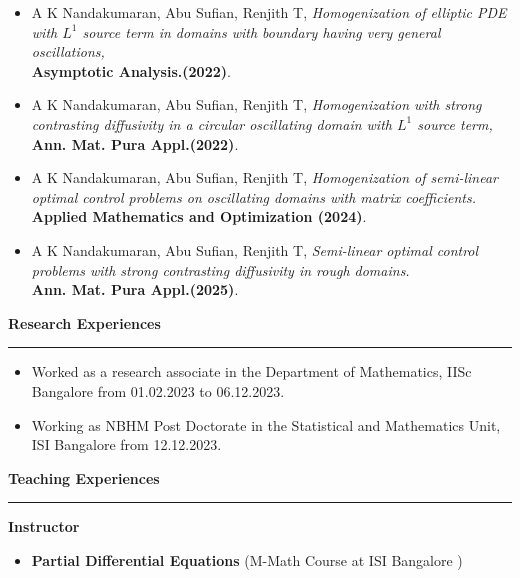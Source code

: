 \documentclass[a4paper,11pt]{letter}
\begin{document}
	\begin{itemize}
		
		\item A K Nandakumaran, Abu Sufian, Renjith T, \textit{Homogenization of elliptic PDE with $L^1$ source term in domains with boundary having very general oscillations,}\\
		\textbf{Asymptotic Analysis.(2022)}.
		
		\item A K Nandakumaran, Abu Sufian, Renjith T, \textit{Homogenization with strong contrasting diffusivity in a circular oscillating domain with $L^1$ source term,}\\
		\textbf{Ann. Mat. Pura Appl.(2022)}.
		
		\item A K Nandakumaran, Abu Sufian, Renjith T, \textit{Homogenization of semi-linear optimal control problems on oscillating domains with matrix coefficients.}\\
		\textbf{Applied Mathematics and Optimization (2024)}.
		
		\item A K Nandakumaran, Abu Sufian, Renjith T, \textit{Semi-linear optimal control problems with strong contrasting diffusivity in rough domains.}\\
		\textbf{Ann. Mat. Pura Appl.(2025)}.
	\end{itemize}
	
	\textbf{\large Research Experiences}\smallskip\hrule
	
	\begin{itemize}
		\item Worked as a research associate in the Department of Mathematics, IISc Bangalore from 01.02.2023 to 06.12.2023.
		\item Working as NBHM Post Doctorate in the Statistical and Mathematics Unit, ISI Bangalore from 12.12.2023.
	\end{itemize}
	
	\newpage

	\textbf{\large Teaching Experiences}\smallskip\hrule
	
	\textbf{Instructor}
	\begin{itemize}
		\item \textbf{Partial Differential Equations} (M-Math Course at ISI Bangalore )
	\end{itemize}
	
\end{document}
